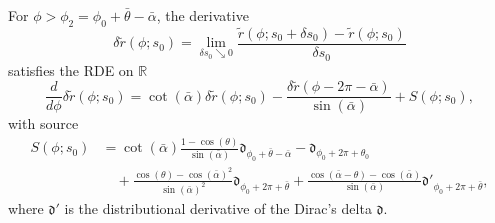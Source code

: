 \documentclass[10pt,a4paper]{amsart}
\newcommand{\Diracd}{\mathfrak{d}}
\newcommand{\R}{\mathbb{R}}
\begin{document}
\begin{proposition}
\label{Prop:equa_delta_tilde_r_segm}
For $\phi > \phi_2 = \phi_0 + \bar \theta - \bar \alpha$, the derivative 
$$
\delta \tilde r(\phi;s_0) = \lim_{\delta s_0 \searrow 0} \frac{\tilde r(\phi;s_0 + \delta s_0) - \tilde r(\phi;s_0)}{\delta s_0}
$$
satisfies the RDE on $\R$
\begin{equation*}
\frac{d}{d\phi} \delta \tilde r(\phi;s_0) = \cot(\bar \alpha) \delta \tilde r(\phi;s_0) - \frac{\delta \tilde r(\phi - 2\pi - \bar \alpha)}{\sin(\bar \alpha)} + S(\phi;s_0),
\end{equation*}
with source
\begin{align*}
S(\phi;s_0) &= \cot(\bar \alpha) \frac{1 - \cos(\theta)}{\sin(\bar \alpha)} \Diracd_{\phi_0 + \bar \theta - \bar \alpha} - \Diracd_{\phi_0 + 2\pi + \theta_0} \\
& \quad + \frac{\cos(\theta) - \cos(\bar \alpha)^2}{\sin(\bar \alpha)^2} \Diracd_{\phi_0 + 2\pi + \bar \theta} + \frac{\cos(\bar \alpha - \theta) - \cos(\bar \alpha)}{\sin(\bar \alpha)} \Diracd'_{\phi_0 + 2\pi + \bar \theta},
\end{align*}
where $\Diracd'$ is the distributional derivative of the Dirac's delta $\Diracd$.
\end{proposition}
\end{document}
